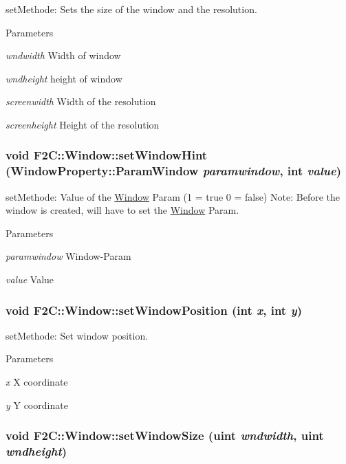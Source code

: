 setMethode: Sets the size of the window and the resolution. 
\begin{DoxyParams}{Parameters}
\item[{\em wndwidth}]Width of window \item[{\em wndheight}]height of window \item[{\em screenwidth}]Width of the resolution \item[{\em screenheight}]Height of the resolution \end{DoxyParams}
\hypertarget{class_f2_c_1_1_window_a8d5436c04afd4ea15ea541ff90d77138}{
\subsubsection[{setWindowHint}]{\setlength{\rightskip}{0pt plus 5cm}void F2C::Window::setWindowHint ({\bf WindowProperty::ParamWindow} {\em paramwindow}, \/  int {\em value})}}
\label{class_f2_c_1_1_window_a8d5436c04afd4ea15ea541ff90d77138}


setMethode: Value of the \hyperlink{class_f2_c_1_1_window}{Window} Param (1 = true 0 = false) Note: Before the window is created, will have to set the \hyperlink{class_f2_c_1_1_window}{Window} Param. 
\begin{DoxyParams}{Parameters}
\item[{\em paramwindow}]Window-\/Param \item[{\em value}]Value \end{DoxyParams}
\hypertarget{class_f2_c_1_1_window_a1386414654c4e87f67f31076a8b34aa5}{
\subsubsection[{setWindowPosition}]{\setlength{\rightskip}{0pt plus 5cm}void F2C::Window::setWindowPosition (int {\em x}, \/  int {\em y})}}
\label{class_f2_c_1_1_window_a1386414654c4e87f67f31076a8b34aa5}


setMethode: Set window position. 
\begin{DoxyParams}{Parameters}
\item[{\em x}]X coordinate \item[{\em y}]Y coordinate \end{DoxyParams}
\hypertarget{class_f2_c_1_1_window_a31ea5cf746375e50bbc3d547eb249155}{
\subsubsection[{setWindowSize}]{\setlength{\rightskip}{0pt plus 5cm}void F2C::Window::setWindowSize ({\bf uint} {\em wndwidth}, \/  {\bf uint} {\em wndheight})}}
\label{class_f2_c_1_1_window_a31ea5cf746375e50bbc3d547eb249155}


